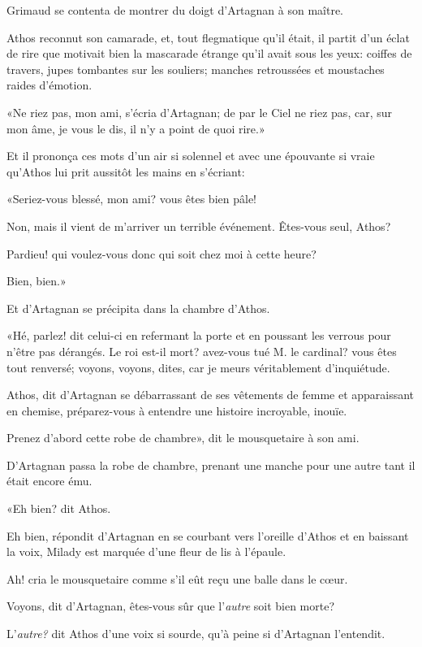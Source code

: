 Grimaud se contenta de montrer du doigt d'Artagnan à son maître. 

Athos reconnut son camarade, et, tout flegmatique qu'il était, il partit d'un éclat de rire que motivait bien la mascarade étrange qu'il avait sous les yeux: coiffes de travers, jupes tombantes sur les souliers; manches retroussées et moustaches raides d'émotion. 

«Ne riez pas, mon ami, s'écria d'Artagnan; de par le Ciel ne riez pas, car, sur mon âme, je vous le dis, il n'y a point de quoi rire.» 

Et il prononça ces mots d'un air si solennel et avec une épouvante si vraie qu'Athos lui prit aussitôt les mains en s'écriant: 

«Seriez-vous blessé, mon ami? vous êtes bien pâle! 

\speak  Non, mais il vient de m'arriver un terrible événement. Êtes-vous seul, Athos? 

\speak  Pardieu! qui voulez-vous donc qui soit chez moi à cette heure? 

\speak  Bien, bien.» 

Et d'Artagnan se précipita dans la chambre d'Athos. 

«Hé, parlez! dit celui-ci en refermant la porte et en poussant les verrous pour n'être pas dérangés. Le roi est-il mort? avez-vous tué M. le cardinal? vous êtes tout renversé; voyons, voyons, dites, car je meurs véritablement d'inquiétude. 

\speak  Athos, dit d'Artagnan se débarrassant de ses vêtements de femme et apparaissant en chemise, préparez-vous à entendre une histoire incroyable, inouïe. 

\speak  Prenez d'abord cette robe de chambre», dit le mousquetaire à son ami. 

D'Artagnan passa la robe de chambre, prenant une manche pour une autre tant il était encore ému. 

«Eh bien? dit Athos. 

\speak  Eh bien, répondit d'Artagnan en se courbant vers l'oreille d'Athos et en baissant la voix, Milady est marquée d'une fleur de lis à l'épaule. 

\speak  Ah! cria le mousquetaire comme s'il eût reçu une balle dans le cœur. 

\speak  Voyons, dit d'Artagnan, êtes-vous sûr que l'\textit{autre} soit bien morte? 

\speak  L'\textit{autre?} dit Athos d'une voix si sourde, qu'à peine si d'Artagnan l'entendit. 

